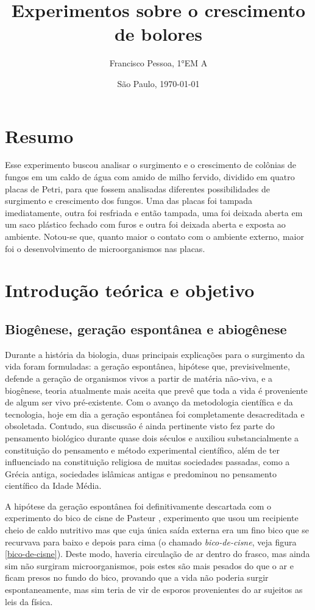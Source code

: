 \documentclass[12pt, titlepage]{article}
\author{Francisco Pessoa, 1°EM A}
\affil{Colégio Ítaca}
\date{São Paulo, \today}
\title{Experimentos sobre o crescimento de bolores}
\begin{document}
\maketitle

\section*{Resumo}
Esse experimento buscou analisar o surgimento e o crescimento de colônias de fungos em um caldo de água com amido de milho fervido, dividido em quatro placas de Petri, para que fossem analisadas diferentes possibilidades de surgimento e crescimento dos fungos. Uma das placas foi tampada imediatamente, outra foi resfriada e então tampada, uma foi deixada aberta em um saco plástico fechado com furos e outra foi deixada aberta e exposta ao ambiente. Notou-se que, quanto maior o contato com o ambiente externo, maior foi o desenvolvimento de microorganismos nas placas.

\section{Introdução teórica e objetivo}
\subsection{Biogênese, geração espontânea e abiogênese\label{intro-surg-vida}}
Durante a história da biologia, duas principais explicações para o surgimento da vida foram formuladas: a geração espontânea, hipótese que, previsivelmente, defende a geração de organismos vivos a partir de matéria não-viva, e a biogênese, teoria atualmente mais aceita que prevê que toda a vida é proveniente de algum ser vivo pré-existente. Com o avanço da metodologia científica e da tecnologia, hoje em dia a geração espontânea foi completamente desacreditada e obsoletada. Contudo, sua discussão é ainda pertinente visto fez parte do pensamento biológico durante quase dois séculos e auxiliou substancialmente a constituição do pensamento e método experimental científico, além de ter influenciado na constituição religiosa de muitas sociedades passadas, como a Grécia antiga, sociedades islâmicas antigas e predominou no pensamento científico da Idade Média.

A hipótese da geração espontânea foi definitivamente descartada com o experimento do bico de cisne de Pasteur \cite{bsfi2019pasteur,enwiki:1195385720}, experimento que usou um recipiente cheio de caldo nutritivo mas que cuja única saída externa era um fino bico que se recurvava para baixo e depois para cima (o chamado \textit{bico-de-cisne}, veja figura \ref{bico-de-cisne}). Deste modo, haveria circulação de ar dentro do frasco, mas ainda sim não surgiram microorganismos, pois estes são mais pesados do que o ar e ficam presos no fundo do bico, provando que a vida não poderia surgir espontaneamente, mas sim teria de vir de esporos provenientes do ar sujeitos as leis da física. 
\end{document}
